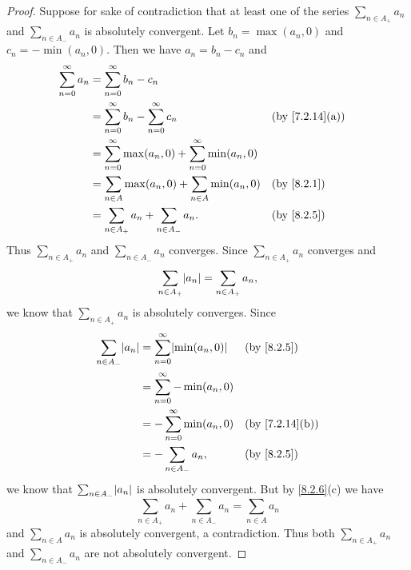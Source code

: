 \begin{proof}
  Suppose for sake of contradiction that at least one of the series \(\sum_{n \in A_+} a_n\) and \(\sum_{n \in A_-} a_n\) is absolutely convergent.
  Let \(b_n = \max(a_n, 0)\) and \(c_n = -\min(a_n, 0)\).
  Then we have \(a_n = b_n - c_n\) and
  \begin{align*}
    \sum_{n = 0}^\infty a_n & = \sum_{n = 0}^\infty b_n - c_n                                                                         \\
                            & = \sum_{n = 0}^\infty b_n - \sum_{n = 0}^\infty c_n                   &  & \text{(by \cref{7.2.14}(a))} \\
                            & = \sum_{n = 0}^\infty \max(a_n, 0) + \sum_{n = 0}^\infty \min(a_n, 0)                                   \\
                            & = \sum_{n \in A} \max(a_n, 0) + \sum_{n \in A} \min(a_n, 0)           &  & \text{(by \cref{8.2.1})}     \\
                            & = \sum_{n \in A_+} a_n + \sum_{n \in A_-} a_n.                        &  & \text{(by \cref{8.2.5})}
  \end{align*}
  Thus \(\sum_{n \in A_+} a_n\) and \(\sum_{n \in A_-} a_n\) converges.
  Since \(\sum_{n \in A_+} a_n\) converges and
  \[
    \sum_{n \in A_+} \abs{a_n} = \sum_{n \in A_+} a_n,
  \]
  we know that \(\sum_{n \in A_+} a_n\) is absolutely converges.
  Since
  \begin{align*}
    \sum_{n \in A_-} \abs{a_n} & = \sum_{n = 0}^\infty \abs{\min(a_n, 0)} &  & \text{(by \cref{8.2.5})}     \\
                               & = \sum_{n = 0}^\infty -\min(a_n, 0)                                        \\
                               & = -\sum_{n = 0}^\infty \min(a_n, 0)      &  & \text{(by \cref{7.2.14}(b))} \\
                               & = -\sum_{n \in A_-} a_n,                 &  & \text{(by \cref{8.2.5})}
  \end{align*}
  we know that \(\sum_{n \in A_-} \abs{a_n}\) is absolutely convergent.
  But by \cref{8.2.6}(c) we have
  \[
    \sum_{n \in A_+} a_n + \sum_{n \in A_-} a_n = \sum_{n \in A} a_n
  \]
  and \(\sum_{n \in A} a_n\) is absolutely convergent, a contradiction.
  Thus both \(\sum_{n \in A_+} a_n\) and \(\sum_{n \in A_-} a_n\) are not absolutely convergent.
\end{proof}

